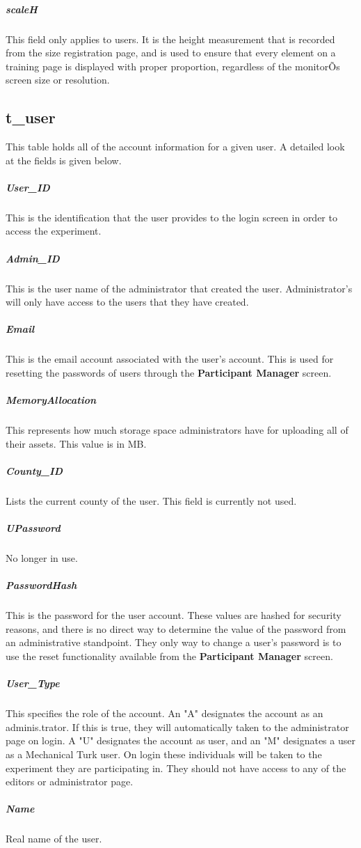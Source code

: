 \documentclass[article]{ij4uq}              %
\begin{document}
\subparagraph{scaleH}
This field only applies to users. It is the height measurement that is recorded from the size registration page, and is used to ensure that every element on a training page is displayed with proper proportion, regardless of the monitorÕs screen size or resolution. 


\subsection{t\_user}
This table holds all of the account information for a given user. A detailed look at the fields is given below.

\subparagraph{User\_ID}
This is the identification that the user provides to the login screen in order to access the experiment.

\subparagraph{Admin\_ID}
This is the user name of the administrator that created the user.  Administrator's will only have access to the users that they have created.

\subparagraph{Email}
This is the email account associated with the user's account.  This is used for resetting the passwords of users through the \textbf{Participant Manager} screen.

\subparagraph{MemoryAllocation}
This represents how much storage space administrators have for uploading all of their assets.  This value is in MB.

\subparagraph{County\_ID}
Lists the current county of the user. This field is currently not used. 

\subparagraph{UPassword}
No longer in use. %

\subparagraph{PasswordHash}
This is the password for the user account.  These values are hashed for security reasons, and there is no direct way to determine the value of the password from an administrative standpoint.  They only way to change a user's password is to use the reset functionality available from the \textbf{Participant Manager} screen.

\subparagraph{User\_Type}
This specifies the role of the account. An "A" designates the account as an adminis.trator. If this is true, they will automatically taken to the administrator page on login. A "U" designates the account as user, and an "M" designates a user as a Mechanical Turk user. On login these individuals will be taken to the experiment they are participating in. They should not have access to any of the editors or administrator page. 

\subparagraph{Name}
Real name of the user. 
\end{document}
